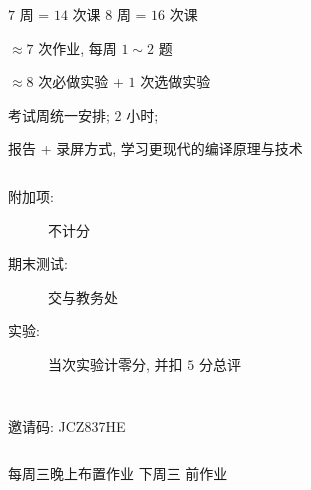 
\begin{frame}{}
  \begin{center}
    {\large $7$ 周 = $14$ 次课 \red{$<$} $8$ 周 = $16$ 次课}
  \end{center}

\end{frame}

\begin{frame}{}
  \begin{center}
     $\approx 7$ 次作业, 每周 $1 \sim 2$ 题

    \pause
    \vspace{1.00cm}
     $\approx 8$ 次必做实验 + $1$ 次选做实验 

    \pause
    \vspace{1.00cm}
     考试周统一安排; $2$ 小时; 

    \pause
    \vspace{1.00cm}
     报告 + 录屏方式, 学习更现代的编译原理与技术
  \end{center}
\end{frame}

\begin{frame}
  \begin{center}
  \end{center}

  \vspace{0.30cm}
  \begin{columns}
      \begin{description}
        \item[附加项:] 不计分
        \item[期末测试:] 交与教务处
        \item[实验:] 当次实验计零分, 并扣 $5$ 分总评
      \end{description}
  \end{columns}
\end{frame}

\begin{frame}{}
  \begin{columns}
      \begin{center}
        邀请码: JCZ837HE
      \end{center}
  \end{columns}

  \vspace{1.0cm}
  \begin{center}
    每周三晚上布置作业 \qquad 下周三  前作业
  \end{center}
\end{frame}


